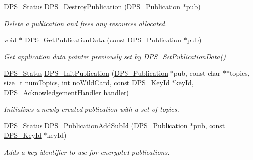 \begin{DoxyCompactItemize}
\hyperlink{group__status_ga30395a84d3cad9d4ec29848106415038}{D\+P\+S\+\_\+\+Status} \hyperlink{group__publication_ga17bb01c949aaaf3bafd53323c9effd5f}{D\+P\+S\+\_\+\+Destroy\+Publication} (\hyperlink{group__publication_ga0d439693474aa54e27f3d45a054696ac}{D\+P\+S\+\_\+\+Publication} $\ast$pub)
\begin{DoxyCompactList}\small\item\em Delete a publication and frees any resources allocated. \end{DoxyCompactList}\item 
void $\ast$ \hyperlink{group__publication_gaa8bee35089ac62289c9ba0e6a0568ca0}{D\+P\+S\+\_\+\+Get\+Publication\+Data} (const \hyperlink{group__publication_ga0d439693474aa54e27f3d45a054696ac}{D\+P\+S\+\_\+\+Publication} $\ast$pub)
\begin{DoxyCompactList}\small\item\em Get application data pointer previously set by \hyperlink{group__publication_ga91c46ccb6df7f4bb99ca5d9d35cc5a4a}{D\+P\+S\+\_\+\+Set\+Publication\+Data()} \end{DoxyCompactList}\item 
\hyperlink{group__status_ga30395a84d3cad9d4ec29848106415038}{D\+P\+S\+\_\+\+Status} \hyperlink{group__publication_ga7b0709e28cb34d5a30b90e4142cd6c19}{D\+P\+S\+\_\+\+Init\+Publication} (\hyperlink{group__publication_ga0d439693474aa54e27f3d45a054696ac}{D\+P\+S\+\_\+\+Publication} $\ast$pub, const char $\ast$$\ast$topics, size\+\_\+t num\+Topics, int no\+Wild\+Card, const \hyperlink{group__keystore_ga4345e29dd2ad5d7fd88a1e988787bd72}{D\+P\+S\+\_\+\+Key\+Id} $\ast$key\+Id, \hyperlink{group__publication_gaf8615f0bcd3d95859cd7f2cdbf772e23}{D\+P\+S\+\_\+\+Acknowledgement\+Handler} handler)
\begin{DoxyCompactList}\small\item\em Initializes a newly created publication with a set of topics. \end{DoxyCompactList}\item 
\hyperlink{group__status_ga30395a84d3cad9d4ec29848106415038}{D\+P\+S\+\_\+\+Status} \hyperlink{group__publication_ga91471ddf6f66798e255b28b3e913144b}{D\+P\+S\+\_\+\+Publication\+Add\+Sub\+Id} (\hyperlink{group__publication_ga0d439693474aa54e27f3d45a054696ac}{D\+P\+S\+\_\+\+Publication} $\ast$pub, const \hyperlink{group__keystore_ga4345e29dd2ad5d7fd88a1e988787bd72}{D\+P\+S\+\_\+\+Key\+Id} $\ast$key\+Id)
\begin{DoxyCompactList}\small\item\em Adds a key identifier to use for encrypted publications. \end{DoxyCompactList}\item 
$$
\end{DoxyCompactItemize}
